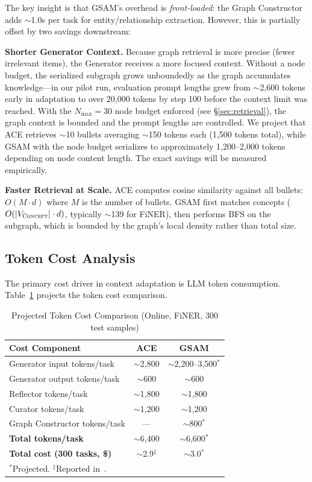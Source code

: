 \documentclass[12pt,a4paper]{article}
\begin{document}
The key insight is that GSAM's overhead is \textit{front-loaded}: the Graph Constructor adds $\sim$1.0s per task for entity/relationship extraction. However, this is partially offset by two savings downstream:

\textbf{Shorter Generator Context.} Because graph retrieval is more precise (fewer irrelevant items), the Generator receives a more focused context. Without a node budget, the serialized subgraph grows unboundedly as the graph accumulates knowledge---in our pilot run, evaluation prompt lengths grew from $\sim$2,600 tokens early in adaptation to over 20,000 tokens by step 100 before the context limit was reached. With the $N_{\max} = 30$ node budget enforced (see \S\ref{sec:retrieval}), the graph context is bounded and the prompt lengths are controlled. We project that ACE retrieves $\sim$10 bullets averaging $\sim$150 tokens each (1,500 tokens total), while GSAM with the node budget serializes to approximately 1,200--2,000 tokens depending on node content length. The exact savings will be measured empirically.

\textbf{Faster Retrieval at Scale.} ACE computes cosine similarity against all bullets: $O(M \cdot d)$ where $M$ is the number of bullets. GSAM first matches concepts ($O(|V_{\textsc{Concept}}| \cdot d)$, typically $\sim$139 for FiNER), then performs BFS on the subgraph, which is bounded by the graph's local density rather than total size.

\subsection{Token Cost Analysis}

The primary cost driver in context adaptation is LLM token consumption. Table~\ref{tab:token-cost} projects the token cost comparison.

\begin{table}[t]
\centering
\caption{Projected Token Cost Comparison (Online, FiNER, 300 test samples)}
\label{tab:token-cost}
\small
\begin{tabular}{@{}lcc@{}}
\toprule
\textbf{Cost Component} & \textbf{ACE} & \textbf{GSAM} \\
\midrule
Generator input tokens/task & $\sim$2,800 & $\sim$2,200--3,500$^*$ \\
Generator output tokens/task & $\sim$600 & $\sim$600 \\
Reflector tokens/task & $\sim$1,800 & $\sim$1,800 \\
Curator tokens/task & $\sim$1,200 & $\sim$1,200 \\
Graph Constructor tokens/task & --- & $\sim$800$^*$ \\
\midrule
\textbf{Total tokens/task} & $\sim$6,400 & $\sim$6,600$^*$ \\
\textbf{Total cost (300 tasks, \$)} & $\sim$2.9$^{\ddagger}$ & $\sim$3.0$^*$ \\
\bottomrule
\multicolumn{3}{l}{\scriptsize $^*$Projected. $^{\ddagger}$Reported in~\cite{ace2025}.}
\end{tabular}
\end{table}
\end{document}
